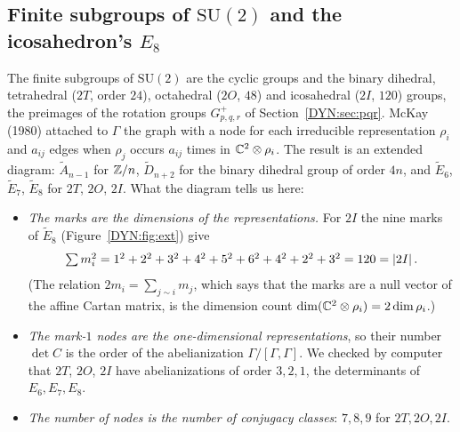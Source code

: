 \subsection*{Finite subgroups of $\mathrm{SU}(2)$ and the icosahedron's $E_8$}
The finite subgroups of $\mathrm{SU}(2)$ are the cyclic groups and the binary dihedral, tetrahedral
($2T$, order $24$), octahedral ($2O$, $48$) and icosahedral ($2I$, $120$) groups, the preimages of the
rotation groups $G^+_{p,q,r}$ of Section~\ref{DYN:sec:pqr}. McKay (1980) attached to $\Gamma$ the graph with
a node for each irreducible representation $\rho_i$ and $a_{ij}$ edges when $\rho_j$ occurs $a_{ij}$ times in
$\mathbb{C}^2\otimes\rho_i$. The result is an extended diagram: $\tilde A_{n-1}$ for $\mathbb{Z}/n$, $\tilde D_{n+2}$ for the
binary dihedral group of order $4n$, and $\tilde E_6$, $\tilde E_7$, $\tilde E_8$ for $2T$, $2O$, $2I$. What
the diagram tells us here:
\begin{itemize}
\item \emph{The marks are the dimensions of the representations.} For $2I$ the nine marks of
  $\tilde E_8$ (Figure~\ref{DYN:fig:ext}) give
  \[
    \textstyle\sum m_i^2=1^2+2^2+3^2+4^2+5^2+6^2+4^2+2^2+3^2=120=\left\lvert 2I \right\rvert.
  \]
  (The relation
  $2m_i=\sum_{j\sim i}m_j$, which says that the marks are a null vector of the affine Cartan matrix, is the
  dimension count $\dim(\mathbb{C}^2\otimes\rho_i)=2\dim\rho_i$.)
\item \emph{The mark-$1$ nodes are the one-dimensional representations}, so their number $\det C$ is the
  order of the abelianization $\Gamma/[\Gamma,\Gamma]$. We checked by computer that $2T$, $2O$, $2I$ have abelianizations
  of order $3,2,1$, the determinants of $E_6,E_7,E_8$.
\item \emph{The number of nodes is the number of conjugacy classes}: $7,8,9$ for $2T,2O,2I$.
\end{itemize}

